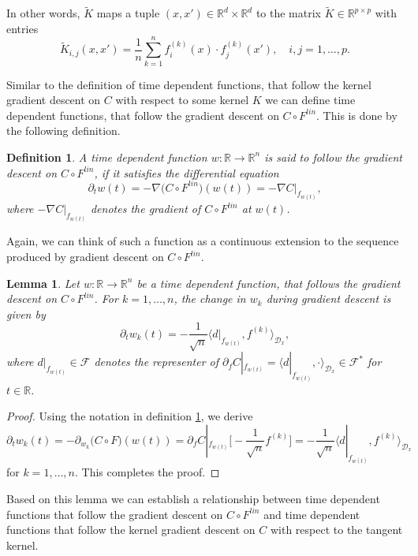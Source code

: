 \documentclass[11pt, a4paper]{article}
\newtheorem{lemma}[theorem]{Lemma}
\newtheorem{definition}[theorem]{Definition}
\newcommand{\R}{\mathds{R}}
\newcommand{\D}{\mathcal{D}}
\newcommand{\F}{\mathcal{F}}
\begin{document}
In other words, $\tilde{K}$ maps a tuple $(x,x') \in \R^d \times \R^d$ to the matrix $\tilde{K} \in \R^{p \times p}$ with entries 
\[ \tilde{K}_{i,j}(x,x') = \frac{1}{n} \sum_{k=1}^{n} f_i^{(k)}(x) \cdot f_j^{(k)}(x'), \quad  i,j=1,\dots,p. \]

Similar to the definition of time dependent functions, that follow the kernel gradient descent on $C$ with respect to some kernel $K$ we can define time dependent functions, that follow the gradient descent on $C \circ F^\textit{lin}$. This is done by the following definition.

\begin{definition} \label{def:follow}
A time dependent function $w : \R \to \R^n$ is said to follow the gradient descent on $C \circ F^\textit{lin}$, if it satisfies the differential equation
\[ \partial_tw(t) = - \nabla \big (C \circ F^\textit{lin} \big ) (w(t)) = - \nabla C|_{f_{w(t)}}, \]
where $- \nabla C|_{f_{w(t)}}$ denotes the gradient of $C \circ F^\textit{lin}$ at $w(t)$.
\end{definition}

Again, we can think of such a function as a continuous extension to the sequence produced by gradient descent on $C \circ F^\textit{lin}$.

\begin{lemma} \label{lem:evolution}
Let $w: \R \to \R^n$ be a time dependent function, that follows the gradient descent on $C \circ F^\textit{lin}$. For $k=1, \dots, n$, the change in $w_k$ during gradient descent is given by
\[ \partial_tw_k(t) = - \frac{1}{\sqrt{n}} \big \langle d|_{f_{w(t)}}, f^{(k)} \big \rangle_{\D_x}, \]
where $d|_{f_{w(t)}} \in \F$ denotes the representer of $\partial_f C|_{f_{w(t)}} = \big \langle d|_{f_{w(t)}}, \cdot \big \rangle_{\D_x} \in \F^*$ for $t \in \R$.
\end{lemma}

\begin{proof}
Using the notation in definition \ref{def:follow}, we derive
\[ \partial_tw_k(t) = - \partial_{w_{k}} \big ( C \circ F \big )(w(t)) = \partial_fC|_{f_{w(t)}} \Big [ - \frac{1}{\sqrt{n}} f^{(k)} \Big ] = - \frac{1}{\sqrt{n}} \big \langle d|_{f_{w(t)}}, f^{(k)} \big \rangle_{\D_x} \]
for $k = 1, \dots, n$. This completes the proof.
\end{proof}

Based on this lemma we can establish a relationship between time dependent functions that follow the gradient descent on $C \circ F^\textit{lin}$ and time dependent functions that follow the kernel gradient descent on $C$ with respect to the tangent kernel.
\end{document}
